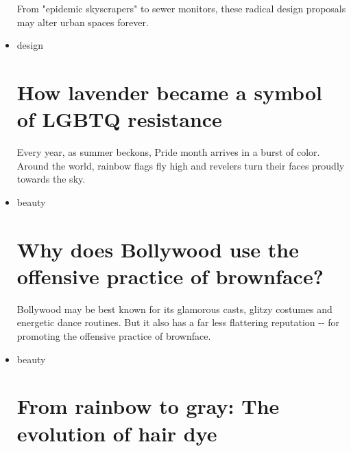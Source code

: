 \begin{itemize}
  \href{/style/article/cities-design-coronavirus/index.html}{}

  From "epidemic skyscrapers" to sewer monitors, these radical design
  proposals may alter urban spaces forever.
\item
  \href{/style/design}{}

  design

  \href{/style/article/lgbtq-lavender-symbolism-pride/index.html}{}

  \hypertarget{how-lavender-became-a-symbol-of-lgbtq-resistance}{%
  \section{How lavender became a symbol of LGBTQ
  resistance}\label{how-lavender-became-a-symbol-of-lgbtq-resistance}}

  \href{/style/article/lgbtq-lavender-symbolism-pride/index.html}{}

  Every year, as summer beckons, Pride month arrives in a burst of
  color. Around the world, rainbow flags fly high and revelers turn
  their faces proudly towards the sky.
\item
  \href{/style/beauty}{}

  beauty

  \href{/style/article/india-bollywood-brownface-hnk-intl/index.html}{}

  \hypertarget{why-does-bollywood-use-the-offensive-practice-of-brownface}{%
  \section{Why does Bollywood use the offensive practice of
  brownface?}\label{why-does-bollywood-use-the-offensive-practice-of-brownface}}

  \href{/style/article/india-bollywood-brownface-hnk-intl/index.html}{}

  Bollywood may be best known for its glamorous casts, glitzy costumes
  and energetic dance routines. But it also has a far less flattering
  reputation -\/- for promoting the offensive practice of brownface.
\item
  \href{/style/beauty}{}

  beauty

  \href{/style/article/hair-dye-evolution/index.html}{}

  \hypertarget{from-rainbow-to-gray-the-evolution-of-hair-dye}{%
  \section{From rainbow to gray: The evolution of hair
  dye}\label{from-rainbow-to-gray-the-evolution-of-hair-dye}}


\end{itemize}
